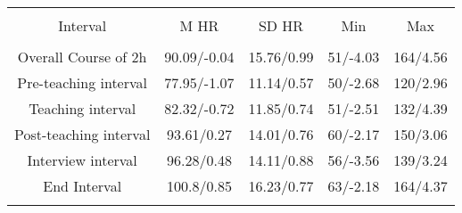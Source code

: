 
\begin{table}[h] \centering 
  \caption{} 
  \label{} 
\begin{tabular}{@{\extracolsep{5pt}} ccccc} 
\\[-1.8ex]\hline 
\hline \\[-1.8ex] 
Interval & M HR & SD HR & Min & Max \\ 
\hline \\[-1.8ex] 
Overall Course of 2h & 90.09/-0.04 & 15.76/0.99 & 51/-4.03 & 164/4.56 \\ 
Pre-teaching interval & 77.95/-1.07 & 11.14/0.57 & 50/-2.68 & 120/2.96 \\ 
Teaching interval & 82.32/-0.72 & 11.85/0.74 & 51/-2.51 & 132/4.39 \\ 
Post-teaching interval & 93.61/0.27 & 14.01/0.76 & 60/-2.17 & 150/3.06 \\ 
Interview interval & 96.28/0.48 & 14.11/0.88 & 56/-3.56 & 139/3.24 \\ 
End Interval & 100.8/0.85 & 16.23/0.77 & 63/-2.18 & 164/4.37 \\ 
\hline \\[-1.8ex] 
\end{tabular} 
\end{table} 
